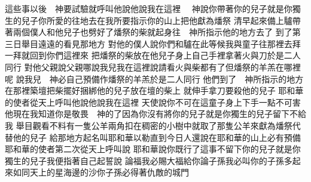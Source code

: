 \bchapter%
這些事以後\chientien 　神要試驗\chientien 就呼叫他說\chientien{}\chientien 他說\chientien 我在這裡\chuan 
{}　神說\chientien 你帶著你的兒子\chientien 就是你獨生的兒子\chientien 你所愛的\chientien 往地去\chientien 在我所要指示你的山上\chientien 把他獻為燔祭\chuan 
{}清早起來\chientien 備上驢\chientien 帶著兩個僕人和他兒子\chientien 也劈好了燔祭的柴\chientien 就起身往　神所指示他的地方去了\chuan 
{}到了第三日\chientien{}舉目遠遠的看見那地方\chuan 
{}對他的僕人說\chientien 你們和驢在此等候\chientien 我與童子往那裡去拜一拜\chientien 就回到你們這裡來\chuan 
{}把燔祭的柴放在他兒子身上\chientien 自己手裡拿著火與刀\yuentien 於是二人同行\chuan 
{}對他父親說\chientien 父親哪\chuan{}說\chientien 我兒\chientien 我在這裡\chuan{}說\chientien 請看\chientien 火與柴都有了\chientien 但燔祭的羊羔在哪裡呢\chuan 
{}說\chientien 我兒\chientien 　神必自己預備作燔祭的羊羔\yuentien 於是二人同行\chuan\Chuan
{}他們到了　神所指示的地方\chientien{}在那裡築壇\chientien 把柴擺好\chientien 捆綁他的兒子\chientien 放在壇的柴上\chuan 
{}就伸手拿刀\chientien 要殺他的兒子\chuan 
{}耶和華的使者從天上呼叫他說\chientien{}\chientien{}\chientien 他說\chientien 我在這裡\chuan 
{}天使說\chientien 你不可在這童子身上下手\chientien 一點不可害他\yuentien 現在我知道你是敬畏　神的了\chientien 因為你沒有將你的兒子\chientien 就是你獨生的兒子\chientien 留下不給我\chuan 
{}舉目觀看\chientien 不料\chientien 有一隻公羊\chientien 兩角扣在稠密的小樹中\chientien{}就取了那隻公羊來\chientien 獻為燔祭\chientien 代替他的兒子\chuan 
{}給那地方起名叫耶和華以勒\chientien{}直到今日人還說\chientien 在耶和華的山上必有預備\chuan 
{}耶和華的使者第二次從天上呼叫說\chientien 
{}耶和華說你既行了這事\chientien 不留下你的兒子\chientien 就是你獨生的兒子\chientien 我便指著自己起誓說\chientien 
{}論福\chientien 我必賜大福給你\chientien 論子孫\chientien 我必叫你的子孫多起來\chientien 如同天上的星\chientien 海邊的沙\chientien 你子孫必得著仇敵的城門\chuan 
